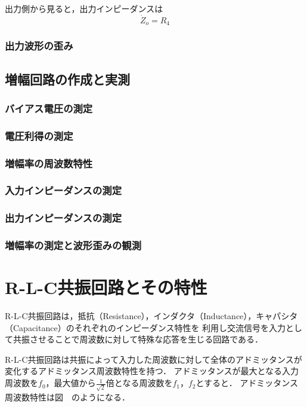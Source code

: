 \documentclass[dvipdfmx,titlepage,a4j]{jsarticle}  %
\begin{document}
出力側から見ると，出力インピーダンスは
\begin{equation}
  \dot{Z}_o = R_4
\end{equation}

\subsubsection{出力波形の歪み}

\subsection{増幅回路の作成と実測}

\subsubsection{バイアス電圧の測定}

\subsubsection{電圧利得の測定}

\subsubsection{増幅率の周波数特性}

\subsubsection{入力インピーダンスの測定}

\subsubsection{出力インピーダンスの測定}

\subsubsection{増幅率の測定と波形歪みの観測}

\section{R-L-C共振回路とその特性}
R-L-C共振回路は，抵抗（Resistance），インダクタ（Inductance），キャパシタ（Capacitance）のそれぞれのインピーダンス特性を
利用し交流信号を入力として共振させることで周波数に対して特殊な応答を生じる回路である．

R-L-C共振回路は共振によって入力した周波数に対して全体のアドミッタンスが変化するアドミッタンス周波数特性を持つ．
アドミッタンスが最大となる入力周波数を$f_0$，最大値から$\frac{1}{\sqrt{2}}$倍となる周波数を$f_1$，$f_2$とすると．
アドミッタンス周波数特性は図　のようになる．
\end{document}
